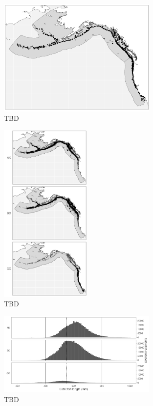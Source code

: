 \documentclass{article}
\begin{document}
\begin{figure}[htb]
    \centering
    \includegraphics[width = 0.7\textwidth]{map-regions-3-released}
    \caption{TBD}
    \label{fig:map-regions-3-released}
\end{figure}

\begin{figure}[htb]
    \centering
    \includegraphics[width = 0.4\textwidth]{map-regions-3-recovered}
    \caption{TBD}
    \label{fig:map-regions-3-recovered}
\end{figure}

\begin{figure}[htb]
    \centering
    \includegraphics[width = 0.7\textwidth]{bar-regions-3-released-by-size}
    \caption{TBD}
    \label{fig:bar-regions-3-released-by-size}
\end{figure}
\end{document}
